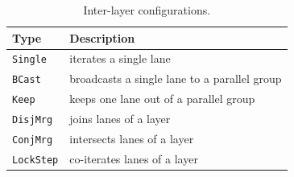 \begin{table}[htbp!]
\centering
\caption{Inter-layer configurations.}
\label{tab:legacy-tmu-layer-modes}
\begin{tabular}{@{}ll@{}}
\toprule
\textbf{Type} & \textbf{Description}\\
\midrule
\texttt{Single} & iterates a single lane\\
\texttt{BCast} & broadcasts a single lane to a parallel group\\
\texttt{Keep} & keeps one lane out of a parallel group\\
\midrule
\texttt{DisjMrg} & joins lanes of a layer\\
\texttt{ConjMrg} & intersects lanes of a layer\\
\texttt{LockStep} & co-iterates lanes of a layer\\
\bottomrule 
\end{tabular}
\end{table}
